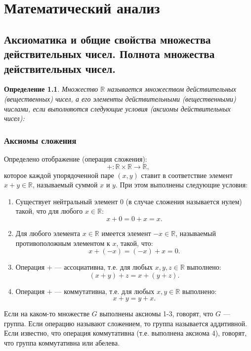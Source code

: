 \documentclass[12pt]{report}
\theoremstyle{plain}
\newtheorem{definition}[theorem]{Определение}
\newcommand{\R}{\mathbb R}
\begin{document}
\tableofcontents

\chapter{Математический анализ}

\section{Аксиоматика и общие свойства множества действительных чисел. Полнота множества действительных чисел.}
\begin{definition}
Множество $\R$ называется множеством действительных (вещественных) чисел,
а его элементы действительными (вещественными) числами, если выполняются следующие
условия (аксиомы действительных чисел):
\end{definition}

\subsection{Аксиомы сложения}
Определено отображение (операция сложения):
$$
  +: \R \times \R \rightarrow \R,
$$
которое каждой упорядоченной паре $(x, y)$ ставит в соответствие элемент
$x + y \in \R$, называемый суммой $x$ и $y$.
При этом выполнены следующие условия:

\begin{enumerate}

\item Существует нейтральный элемент $0$ (в случае сложения называется нулем) такой,
что для любого $x\in \R$:
$$
x + 0 = 0 + x = x.
$$

\item Для любого элемента $x \in \R$ имеется элемент $-x \in \R$,
называемый противоположным элементом к $x$, такой, что:
$$
x + (-x) = (-x) + x = 0.
$$

\item Операция $+$ --- ассоциативна, т.е. для любых $x, y, z \in \R$ выполнено:
$$
(x + y) + z = x + (y + z).
$$

\item Операция $+$ --- коммутативна, т.е. для любых $x, y \in \R$ выполнено:
$$
x + y = y + x.
$$

\end{enumerate}

Если на каком-то множестве $G$ выполнены аксиомы 1-3, говорят, что $G$ --- группа.
Если операцию называют сложением, то группа называется аддитивной.
Если известно, что операция коммутативна (т.е. выполнена аксиома 4), говорят, что
группа коммутативна или абелева.
\end{document}
